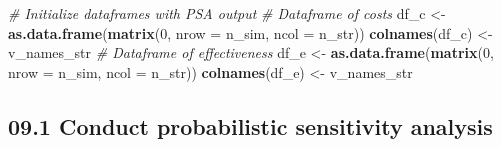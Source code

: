 \documentclass[]{article}
\newenvironment{Shaded}{\begin{snugshade}}{\end{snugshade}}
\newcommand{\KeywordTok}[1]{\textcolor[rgb]{0.13,0.29,0.53}{\textbf{#1}}}
\newcommand{\DataTypeTok}[1]{\textcolor[rgb]{0.13,0.29,0.53}{#1}}
\newcommand{\DecValTok}[1]{\textcolor[rgb]{0.00,0.00,0.81}{#1}}
\newcommand{\CharTok}[1]{\textcolor[rgb]{0.31,0.60,0.02}{#1}}
\newcommand{\StringTok}[1]{\textcolor[rgb]{0.31,0.60,0.02}{#1}}
\newcommand{\CommentTok}[1]{\textcolor[rgb]{0.56,0.35,0.01}{\textit{#1}}}
\newcommand{\ControlFlowTok}[1]{\textcolor[rgb]{0.13,0.29,0.53}{\textbf{#1}}}
\newcommand{\OperatorTok}[1]{\textcolor[rgb]{0.81,0.36,0.00}{\textbf{#1}}}
\newcommand{\NormalTok}[1]{#1}
\begin{document}
\begin{Shaded}
\begin{Highlighting}[]
\CommentTok{# Initialize dataframes with PSA output }
\CommentTok{# Dataframe of costs}
\NormalTok{df_c <-}\StringTok{ }\KeywordTok{as.data.frame}\NormalTok{(}\KeywordTok{matrix}\NormalTok{(}\DecValTok{0}\NormalTok{, }
                      \DataTypeTok{nrow =}\NormalTok{ n_sim,}
                      \DataTypeTok{ncol =}\NormalTok{ n_str))}
\KeywordTok{colnames}\NormalTok{(df_c) <-}\StringTok{ }\NormalTok{v_names_str}
\CommentTok{# Dataframe of effectiveness}
\NormalTok{df_e <-}\StringTok{ }\KeywordTok{as.data.frame}\NormalTok{(}\KeywordTok{matrix}\NormalTok{(}\DecValTok{0}\NormalTok{, }
                      \DataTypeTok{nrow =}\NormalTok{ n_sim,}
                      \DataTypeTok{ncol =}\NormalTok{ n_str))}
\KeywordTok{colnames}\NormalTok{(df_e) <-}\StringTok{ }\NormalTok{v_names_str}
\end{Highlighting}
\end{Shaded}

\subsection{09.1 Conduct probabilistic sensitivity
analysis}\label{conduct-probabilistic-sensitivity-analysis}

\begin{Shaded}
\end{Shaded}
\end{document}
